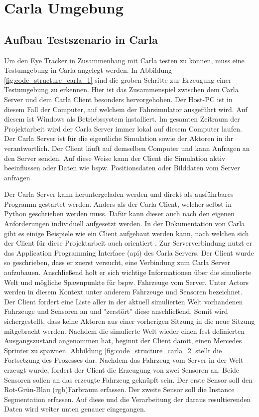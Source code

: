\chapter{Carla Umgebung}
\label{sec:carla umgebung}

\section{Aufbau Testszenario in Carla}

Um den Eye Tracker in Zusammenhang mit Carla testen zu können, muss eine Testumgebung in Carla angelegt werden. In Abbildung \ref{fig:code_structure_carla_1} sind die groben Schritte zur Erzeugung einer Testumgebung zu erkennen. Hier ist das Zusammenspiel zwischen dem Carla Server und dem Carla Client besonders hervorgehoben. Der Host-PC ist in diesem Fall der Computer, auf welchem der Fahrsimulator ausgeführt wird. Auf diesem ist Windows als Betriebssystem installiert. Im gesamten Zeitraum der Projektarbeit wird der Carla Server immer lokal auf diesem Computer laufen. Der Carla Server ist für die eigentliche Simulation sowie der Aktoren in ihr verantwortlich. Der Client läuft auf demselben Computer und kann Anfragen an den Server senden. Auf diese Weise kann der Client die Simulation aktiv beeinflussen oder Daten wie bspw. Positionsdaten oder Bilddaten vom Server anfragen. \cite{lit_website_carla_documentation}

Der Carla Server kann heruntergeladen werden und direkt als ausführbares Programm gestartet werden. Anders als der Carla Client, welcher selbst in Python geschrieben werden muss. Dafür kann dieser auch nach den eigenen Anforderungen individuell aufgesetzt werden. In der Dokumentation von Carla gibt es einige Beispiele wie ein Client aufgebaut werden kann, nach welchen sich der Client für diese Projektarbeit auch orientiert \cite{lit_code_api}. Zur Serververbindung nutzt er das Application Programming Interface (\acrshort{api}) des Carla Servers. Der Client wurde so geschrieben, dass er zuerst versucht, eine Verbindung zum Carla Server aufzubauen. Anschließend holt er sich wichtige Informationen über die simulierte Welt und mögliche \gls{Spawnpunkt}e für bspw. Fahrzeuge vom Server. Unter Actors werden in diesem Kontext unter anderem Fahrzeuge und Sensoren bezeichnet. Der Client fordert eine Liste aller in der aktuell simulierten Welt vorhandenen Fahrzeuge und Sensoren an und "zerstört" diese anschließend. Somit wird sichergestellt, dass keine Aktoren aus einer vorherigen Sitzung in die neue Sitzung mitgebracht werden. Nachdem die simulierte Welt wieder einen fest definierten Ausgangszustand angenommen hat, beginnt der Client damit, einen Mercedes Sprinter zu spawnen. Abbildung \ref{fig:code_structure_carla_2} stellt die Fortsetzung des Prozesses dar. Nachdem das Fahrzeug vom Server in der Welt erzeugt wurde, fordert der Client die Erzeugung von zwei Sensoren an. Beide Sensoren sollen an das erzeugte Fahrzeug geknüpft sein. Der erste Sensor soll den Rot-Grün-Blau (\acrshort{rgb})Farbraum erfassen. Der zweite Sensor soll die Instance Segmentation erfassen. Auf diese und die Verarbeitung der daraus resultierenden Daten wird weiter unten genauer eingegangen. 

